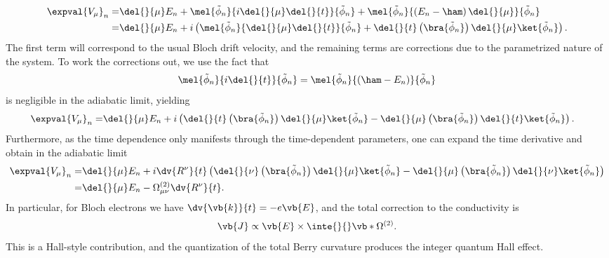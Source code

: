 \begin{align*}
	\expval{V_{\mu}}_{n} =& \del{}{\mu}E_{n} + \mel{\tilde{\phi}_{n}}{i\del{}{\mu}\del{}{t}}{\tilde{\phi}_{n}} + \mel{\tilde{\phi}_{n}}{\left(E_{n} - \ham\right)\del{}{\mu}}{\tilde{\phi}_{n}} \\
	                     =& \del{}{\mu}E_{n} + i\left(\mel{\tilde{\phi}_{n}}{\del{}{\mu}\del{}{t}}{\tilde{\phi}_{n}} + \del{}{t}\left(\bra{\tilde{\phi}_{n}}\right)\del{}{\mu}\ket{\tilde{\phi}_{n}}\right).
\end{align*}
The first term will correspond to the usual Bloch drift velocity, and the remaining terms are corrections due to the parametrized nature of the system. To work the corrections out, we use the fact that
\begin{align*}
	\mel{\tilde{\phi}_{n}}{i\del{}{t}}{\tilde{\phi}_{n}} = \mel{\tilde{\phi}_{n}}{(\ham - E_{n})}{\tilde{\phi}_{n}}
\end{align*}
is negligible in the adiabatic limit, yielding
\begin{align*}
	\expval{V_{\mu}}_{n} =& \del{}{\mu}E_{n} + i\left(\del{}{t}\left(\bra{\tilde{\phi}_{n}}\right)\del{}{\mu}\ket{\tilde{\phi}_{n}} - \del{}{\mu}\left(\bra{\tilde{\phi}_{n}}\right)\del{}{t}\ket{\tilde{\phi}_{n}}\right).
\end{align*}
Furthermore, as the time dependence only manifests through the time-dependent parameters, one can expand the time derivative and obtain in the adiabatic limit
\begin{align*}
	\expval{V_{\mu}}_{n} =& \del{}{\mu}E_{n} + i\dv{R^{\nu}}{t}\left(\del{}{\nu}\left(\bra{\tilde{\phi}_{n}}\right)\del{}{\mu}\ket{\tilde{\phi}_{n}} - \del{}{\mu}\left(\bra{\tilde{\phi}_{n}}\right)\del{}{\nu}\ket{\tilde{\phi}_{n}}\right) \\
	=& \del{}{\mu}E_{n} - \Omega^{(2)}_{\mu\nu}\dv{R^{\nu}}{t}.
\end{align*}
In particular, for Bloch electrons we have $\dv{\vb{k}}{t} = -e\vb{E}$, and the total correction to the conductivity is
\begin{align*}
	\vb{J} \propto \vb{E}\times\inte{}{}\vb*{\Omega}^{(2)}.
\end{align*}
This is a Hall-style contribution, and the quantization of the total Berry curvature produces the integer quantum Hall effect.

